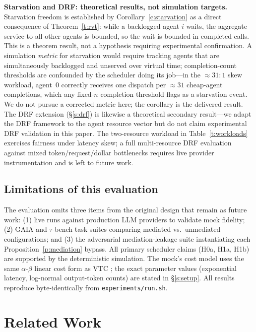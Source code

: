 \documentclass[letterpaper,11pt,leqno]{article}
\begin{document}
\textbf{Starvation and DRF: theoretical results, not simulation targets.} Starvation freedom is established by Corollary~\ref{c:starvation} as a direct consequence of Theorem~\ref{t:rvt}: while a backlogged agent $i$ waits, the aggregate service to all other agents is bounded, so the wait is bounded in completed calls. This is a theorem result, not a hypothesis requiring experimental confirmation. A simulation \emph{metric} for starvation would require tracking agents that are simultaneously backlogged and unserved over virtual time; completion-count thresholds are confounded by the scheduler doing its job---in the ${\approx}31\!:\!1$ skew workload, agent~0 correctly receives one dispatch per $\approx31$ cheap-agent completions, which any fixed-$n$ completion threshold flags as a starvation event. We do not pursue a corrected metric here; the corollary is the delivered result. The DRF extension (\S\ref{s:drf}) is likewise a theoretical secondary result---we adapt the DRF framework to the agent resource vector but do not claim experimental DRF validation in this paper. The two-resource workload in Table~\ref{t:workloads} exercises fairness under latency skew; a full multi-resource DRF evaluation against mixed token/request/dollar bottlenecks requires live provider instrumentation and is left to future work.

\subsection{Limitations of this evaluation}\label{s:limitations}

The evaluation omits three items from the original design that remain as future work: (1) live runs against production LLM providers to validate mock fidelity; (2) GAIA and $\tau$-bench task suites comparing mediated vs.\ unmediated configurations; and (3) the adversarial mediation-leakage suite instantiating each Proposition~\ref{p:mediation} bypass. All primary scheduler claims (H0a, H1a, H1b) are supported by the deterministic simulation. The mock's cost model uses the same $\alpha$-$\beta$ linear cost form as VTC \citep{Sheng24}; the exact parameter values (exponential latency, log-normal output-token counts) are stated in \S\ref{s:setup}. All results reproduce byte-identically from \texttt{experiments/run.sh}.

\section{Related Work}\label{s:related}
\end{document}
